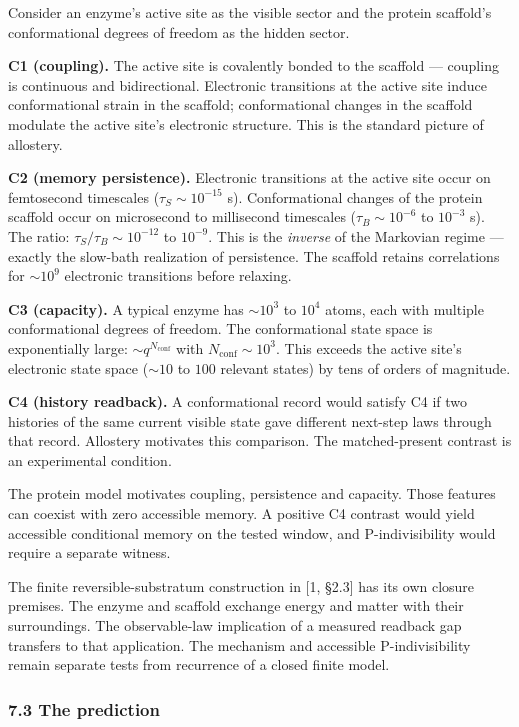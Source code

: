 \documentclass[
]{article}
\begin{document}
Consider an enzyme's active site as the visible sector and the protein
scaffold's conformational degrees of freedom as the hidden sector.

\textbf{C1 (coupling).} The active site is covalently bonded to the
scaffold --- coupling is continuous and bidirectional. Electronic
transitions at the active site induce conformational strain in the
scaffold; conformational changes in the scaffold modulate the active
site's electronic structure. This is the standard picture of allostery.

\textbf{C2 (memory persistence).} Electronic transitions at the active
site occur on femtosecond timescales (\(\tau_S \sim 10^{-15}\) s).
Conformational changes of the protein scaffold occur on microsecond to
millisecond timescales (\(\tau_B \sim 10^{-6}\) to \(10^{-3}\) s). The
ratio: \(\tau_S / \tau_B \sim 10^{-12}\) to \(10^{-9}\). This is the
\emph{inverse} of the Markovian regime --- exactly the slow-bath
realization of persistence. The scaffold retains correlations for
\(\sim 10^9\) electronic transitions before relaxing.

\textbf{C3 (capacity).} A typical enzyme has \(\sim 10^3\) to \(10^4\)
atoms, each with multiple conformational degrees of freedom. The
conformational state space is exponentially large:
\(\sim q^{N_{\text{conf}}}\) with \(N_{\text{conf}} \sim 10^3\). This
exceeds the active site's electronic state space (\(\sim 10\) to \(100\)
relevant states) by tens of orders of magnitude.

\textbf{C4 (history readback).} A conformational record would satisfy C4
if two histories of the same current visible state gave different
next-step laws through that record. Allostery motivates this comparison.
The matched-present contrast is an experimental condition.

The protein model motivates coupling, persistence and capacity. Those
features can coexist with zero accessible memory. A positive C4 contrast
would yield accessible conditional memory on the tested window, and
P-indivisibility would require a separate witness.

The finite reversible-substratum construction in {[}1, §2.3{]} has its
own closure premises. The enzyme and scaffold exchange energy and matter
with their surroundings. The observable-law implication of a measured
readback gap transfers to that application. The mechanism and accessible
P-indivisibility remain separate tests from recurrence of a closed
finite model.

\hypertarget{the-prediction}{%
\subsubsection{7.3 The prediction}\label{the-prediction}}
\end{document}
